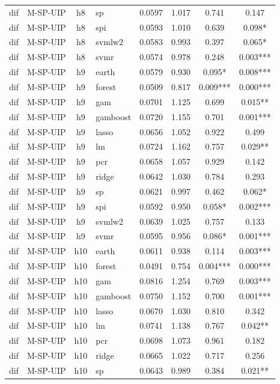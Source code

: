 \begin{ThreePartTable}
\begin{longtable}[t]{llclcccc}
dif & M-SP-UIP & h8 & sp & 0.0597 & 1.017 & 0.741 & 0.147\\
dif & M-SP-UIP & h8 & spi & 0.0593 & 1.010 & 0.639 & 0.098*\\
dif & M-SP-UIP & h8 & svmlw2 & 0.0583 & 0.993 & 0.397 & 0.065*\\
dif & M-SP-UIP & h8 & svmr & 0.0574 & 0.978 & 0.248 & 0.003***\\
\addlinespace
dif & M-SP-UIP & h9 & earth & 0.0579 & 0.930 & 0.095* & 0.008***\\
dif & M-SP-UIP & h9 & forest & 0.0509 & 0.817 & 0.009*** & 0.000***\\
dif & M-SP-UIP & h9 & gam & 0.0701 & 1.125 & 0.699 & 0.015**\\
dif & M-SP-UIP & h9 & gamboost & 0.0720 & 1.155 & 0.701 & 0.001***\\
dif & M-SP-UIP & h9 & lasso & 0.0656 & 1.052 & 0.922 & 0.499\\
dif & M-SP-UIP & h9 & lm & 0.0724 & 1.162 & 0.757 & 0.029**\\
dif & M-SP-UIP & h9 & pcr & 0.0658 & 1.057 & 0.929 & 0.142\\
dif & M-SP-UIP & h9 & ridge & 0.0642 & 1.030 & 0.784 & 0.293\\
dif & M-SP-UIP & h9 & sp & 0.0621 & 0.997 & 0.462 & 0.062*\\
dif & M-SP-UIP & h9 & spi & 0.0592 & 0.950 & 0.058* & 0.002***\\
dif & M-SP-UIP & h9 & svmlw2 & 0.0639 & 1.025 & 0.757 & 0.133\\
dif & M-SP-UIP & h9 & svmr & 0.0595 & 0.956 & 0.086* & 0.001***\\
\addlinespace
dif & M-SP-UIP & h10 & earth & 0.0611 & 0.938 & 0.114 & 0.003***\\
dif & M-SP-UIP & h10 & forest & 0.0491 & 0.754 & 0.004*** & 0.000***\\
dif & M-SP-UIP & h10 & gam & 0.0816 & 1.254 & 0.769 & 0.003***\\
dif & M-SP-UIP & h10 & gamboost & 0.0750 & 1.152 & 0.700 & 0.001***\\
dif & M-SP-UIP & h10 & lasso & 0.0670 & 1.030 & 0.810 & 0.342\\
dif & M-SP-UIP & h10 & lm & 0.0741 & 1.138 & 0.767 & 0.042**\\
dif & M-SP-UIP & h10 & pcr & 0.0698 & 1.073 & 0.961 & 0.182\\
dif & M-SP-UIP & h10 & ridge & 0.0665 & 1.022 & 0.717 & 0.256\\
dif & M-SP-UIP & h10 & sp & 0.0643 & 0.989 & 0.384 & 0.021**\\

\end{longtable}
\end{ThreePartTable}
